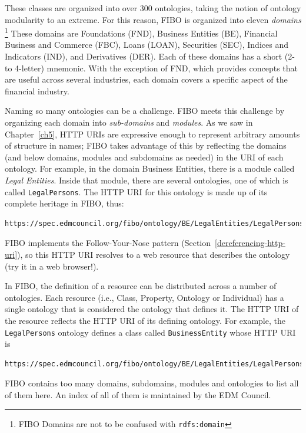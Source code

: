 These classes are organized into over 300 ontologies, taking the notion of ontology modularity to an extreme.  
For this reason, FIBO is organized into eleven \emph{domains} \footnote{FIBO Domains are not to be confused with \texttt{rdfs:domain}}
These domains are Foundations (FND), Business Entities (BE), Financial Business and Commerce (FBC), Loans (LOAN), Securities (SEC), 
Indices and Indicators (IND), and  Derivatives (DER).  Each of these domains has a short (2- to 4-letter) mnemonic.   With the exception of FND, which provides concepts that are useful across several industries, each domain covers a specific aspect of the
financial industry.

Naming so many ontologies can be a challenge.  FIBO meets this challenge by organizing each domain 
into \emph{sub-domains} and \emph{modules}. 
As we saw in Chapter~\ref{ch5}, HTTP URIs are expressive enough to represent arbitrary amounts of structure in names; 
FIBO takes advantage of this by reflecting the domains (and below domains, modules  and subdomains as needed) in the URI 
of each ontology.  For example, in the domain Business Entities, there is a module called \emph{Legal Entities}.  Inside that 
module, there are several ontologies, one of which is called \texttt{LegalPersons}.  The HTTP URI for this ontology
is made up of its complete heritage in FIBO, thus:

\begin{lstlisting}
https://spec.edmcouncil.org/fibo/ontology/BE/LegalEntities/LegalPersons/
\end{lstlisting}

FIBO implements the Follow-Your-Nose pattern (Section~\ref{dereferencing-http-uri}), so this HTTP URI resolves to 
a web resource that describes the ontology (try it in a web browser!). 

In FIBO, the definition of a resource can be distributed across a number of ontologies.  Each resource 
(i.e., Class, Property, Ontology or Individual) has a single ontology that is considered the ontology
that defines it.  The HTTP URI of the resource reflects the HTTP URI of its defining ontology.  For example,  the \texttt{LegalPersons}
ontology defines  a class called \texttt{BusinessEntity} whose HTTP URI is 

\begin{lstlisting}
https://spec.edmcouncil.org/fibo/ontology/BE/LegalEntities/LegalPersons/BusinessEntity
\end{lstlisting}

FIBO contains too many domains, subdomains, modules and ontologies to list all of them here. An index of all of them
is maintained by the EDM Council.  

